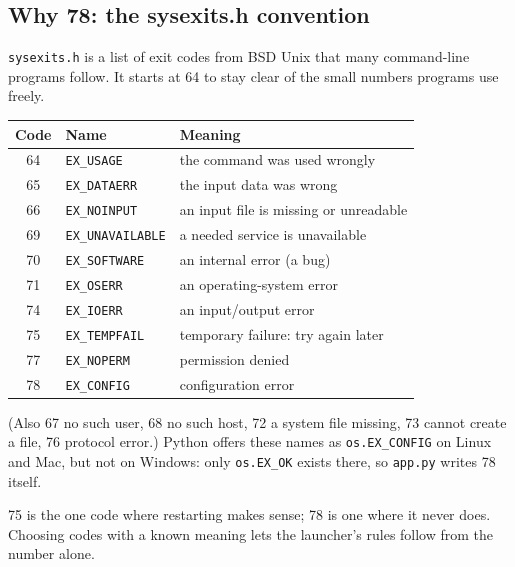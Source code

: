 \documentclass[11pt,a4paper]{article}
\begin{document}
\subsection{Why 78: the sysexits.h convention}
\texttt{sysexits.h} is a list of exit codes from BSD Unix that many command-line programs follow.
It starts at 64 to stay clear of the small numbers programs use freely.
\begin{center}
\begin{tabularx}{\textwidth}{c l X}
\toprule
\textbf{Code} & \textbf{Name} & \textbf{Meaning} \\
\midrule
64 & \texttt{EX\_USAGE} & the command was used wrongly \\
65 & \texttt{EX\_DATAERR} & the input data was wrong \\
66 & \texttt{EX\_NOINPUT} & an input file is missing or unreadable \\
69 & \texttt{EX\_UNAVAILABLE} & a needed service is unavailable \\
70 & \texttt{EX\_SOFTWARE} & an internal error (a bug) \\
71 & \texttt{EX\_OSERR} & an operating-system error \\
74 & \texttt{EX\_IOERR} & an input/output error \\
75 & \texttt{EX\_TEMPFAIL} & temporary failure: try again later \\
77 & \texttt{EX\_NOPERM} & permission denied \\
78 & \texttt{EX\_CONFIG} & configuration error \\
\bottomrule
\end{tabularx}
\end{center}
\noindent (Also 67 no such user, 68 no such host, 72 a system file missing, 73 cannot create a
file, 76 protocol error.) Python offers these names as \texttt{os.EX\_CONFIG} on Linux and Mac,
but not on Windows: only \texttt{os.EX\_OK} exists there, so \texttt{app.py} writes 78 itself.

\begin{why}
75 is the one code where restarting makes sense; 78 is one where it never does. Choosing codes
with a known meaning lets the launcher's rules follow from the number alone.
\end{why}
\end{document}
